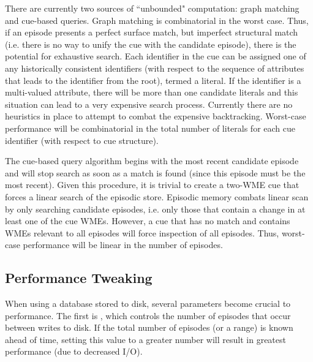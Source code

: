 There are currently two sources of ``unbounded" computation: graph matching and cue-based queries.  
Graph matching is combinatorial in the worst case.  
Thus, if an episode presents a perfect surface match, but imperfect structural match (i.e. there is no way to unify the cue with the candidate episode), there is the potential for exhaustive search.  
Each identifier in the cue can be assigned one of any historically consistent identifiers (with respect to the sequence of attributes that leads to the identifier from the root), termed a literal.  
If the identifier is a multi-valued attribute, there will be more than one candidate literals and this situation can lead to a very expensive search process.  
Currently there are no heuristics in place to attempt to combat the expensive backtracking.  
Worst-case performance will be combinatorial in the total number of literals for each cue identifier (with respect to cue structure).

The cue-based query algorithm begins with the most recent candidate episode and will stop search as soon as a match is found (since this episode must be the most recent).  
Given this procedure, it is trivial to create a two-WME cue that forces a linear search of the episodic store. 
Episodic memory combats linear scan by only searching candidate episodes, i.e. only those that contain a change in at least one of the cue WMEs.  
However, a cue that has no match and contains WMEs relevant to all episodes will force inspection of all episodes.  
Thus, worst-case performance will be linear in the number of episodes. 

\subsection{Performance Tweaking}
When using a database stored to disk, several parameters become crucial to performance.  
The first is , which controls the number of episodes that occur between writes to disk.  
If the total number of episodes (or a range) is known ahead of time, setting this value to a greater number will result in greatest performance (due to decreased I/O).

